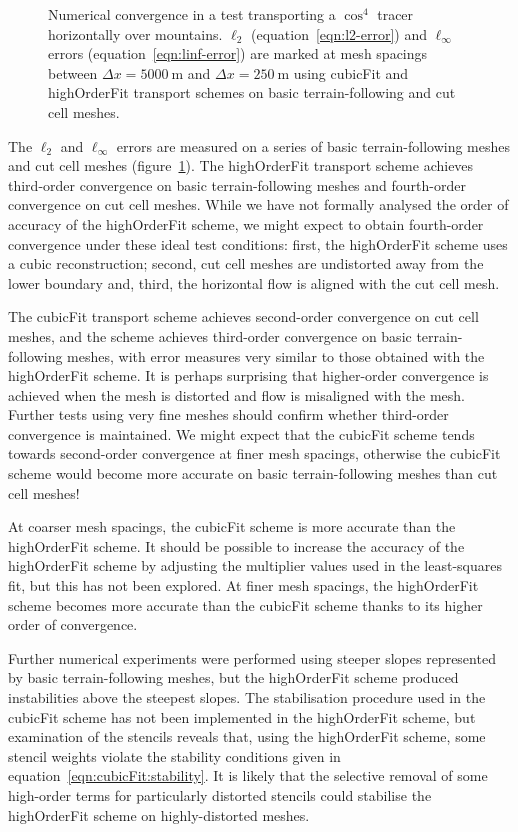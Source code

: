\begin{figure}
	\centering
	
	\caption{Numerical convergence in a test transporting a $\cos^4$ tracer horizontally over mountains.
	$\ell_2$ (equation~\ref{eqn:l2-error}) and $\ell_\infty$ errors (equation~\ref{eqn:linf-error}) are marked at mesh spacings between $\Delta x = \SI{5000}{\meter}$ and $\Delta x = \SI{250}{\meter}$ using cubicFit and highOrderFit transport schemes on basic terrain-following and cut cell meshes.}
	\label{fig:highOrderFit:schaerAdvectSmooth:convergence}
\end{figure}

The $\ell_2$ and $\ell_\infty$ errors are measured on a series of basic terrain-following meshes and cut cell meshes (figure~\ref{fig:highOrderFit:schaerAdvectSmooth:convergence}).
The highOrderFit transport scheme achieves third-order convergence on basic terrain-following meshes and fourth-order convergence on cut cell meshes.
While we have not formally analysed the order of accuracy of the highOrderFit scheme, we might expect to obtain fourth-order convergence under these ideal test conditions: first, the highOrderFit scheme uses a cubic reconstruction; second, cut cell meshes are undistorted away from the lower boundary and, third, the horizontal flow is aligned with the cut cell mesh.

The cubicFit transport scheme achieves second-order convergence on cut cell meshes, and the scheme achieves third-order convergence on basic terrain-following meshes, with error measures very similar to those obtained with the highOrderFit scheme.
It is perhaps surprising that higher-order convergence is achieved when the mesh is distorted and flow is misaligned with the mesh.
Further tests using very fine meshes should confirm whether third-order convergence is maintained.
We might expect that the cubicFit scheme tends towards second-order convergence at finer mesh spacings, otherwise the cubicFit scheme would become more accurate on basic terrain-following meshes than cut cell meshes!

At coarser mesh spacings, the cubicFit scheme is more accurate than the highOrderFit scheme.
It should be possible to increase the accuracy of the highOrderFit scheme by adjusting the multiplier values used in the least-squares fit, but this has not been explored.
At finer mesh spacings, the highOrderFit scheme becomes more accurate than the cubicFit scheme thanks to its higher order of convergence.

Further numerical experiments were performed using steeper slopes represented by basic terrain-following meshes, but the highOrderFit scheme produced instabilities above the steepest slopes.
The stabilisation procedure used in the cubicFit scheme has not been implemented in the highOrderFit scheme, but examination of the stencils reveals that, using the highOrderFit scheme, some stencil weights violate the stability conditions given in equation~\eqref{eqn:cubicFit:stability}.
It is likely that the selective removal of some high-order terms for particularly distorted stencils could stabilise the highOrderFit scheme on highly-distorted meshes.

